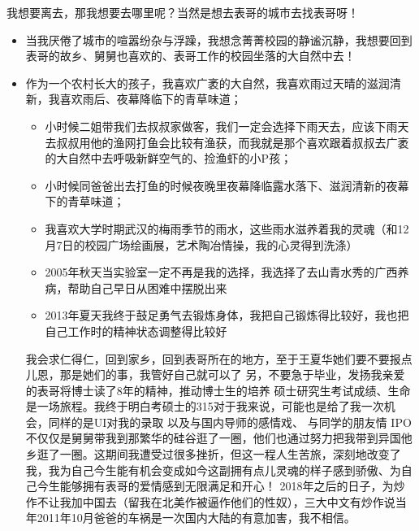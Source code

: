 \documentclass[9pt, b5paper]{article}
\begin{document}
我想要离去，那我想要去哪里呢？当然是想去表哥的城市去找表哥呀！

\begin{itemize}
\item 当我厌倦了城市的喧嚣纷杂与浮躁，我想念菁菁校园的静谧沉静，我想要回到表哥的故乡、舅舅也喜欢的、表哥工作的校园坐落的大自然中去！
\item 作为一个农村长大的孩子，我喜欢广袤的大自然，我喜欢雨过天晴的滋润清新，我喜欢雨后、夜幕降临下的青草味道；
\begin{itemize}
\item 小时候二姐带我们去叔叔家做客，我们一定会选择下雨天去，应该下雨天去叔叔用他的渔网打鱼会比较有渔获，而我就是那个喜欢跟着叔叔去广袤的大自然中去呼吸新鲜空气的、捡渔虾的小P孩；
\item 小时候同爸爸出去打鱼的时候夜晚里夜幕降临露水落下、滋润清新的夜幕下的青草味道；
\item 我喜欢大学时期武汉的梅雨季节的雨水，这些雨水滋养着我的灵魂（和12月7日的校园广场绘画展，艺术陶冶情操，我的心灵得到洗涤）
\item 2005年秋天当实验室一定不再是我的选择，我选择了去山青水秀的广西养病，帮助自己早日从困难中摆脱出来
\item 2013年夏天我终于鼓足勇气去锻炼身体，我把自己锻炼得比较好，我也把自己工作时的精神状态调整得比较好
\end{itemize}

我会求仁得仁，回到家乡，回到表哥所在的地方，至于王夏华她们要不要报点儿恩，那是她们的事，我管好自己就可以了
另，不要急于毕业，发扬我亲爱的表哥将博士读了8年的精神，推动博士生的培养
硕士研究生考试成绩、生命是一场旅程。我终于明白考硕士的315对于我来说，可能也是给了我一次机会，同样的是UI对我的录取
以及与国内导师的感情戏、
与同学的朋友情
IPO 
不仅仅是舅舅带我到那繁华的硅谷逛了一圈，他们也通过努力把我带到异国他乡逛了一圈。这期间我遭受过很多挫折，但这一程人生苦旅，深刻地改变了我，我为自己今生能有机会变成如今这副拥有点儿灵魂的样子感到骄傲、为自己今生能够拥有表哥的爱情感到无限满足和开心！
2018年之后的日子，为炒作不让我加中国去（留我在北美作被逼作他们的性奴），三大中文有炒作说当年2011年10月爸爸的车祸是一次国内大陆的有意加害，我不相信。
\end{itemize}
\end{document}
